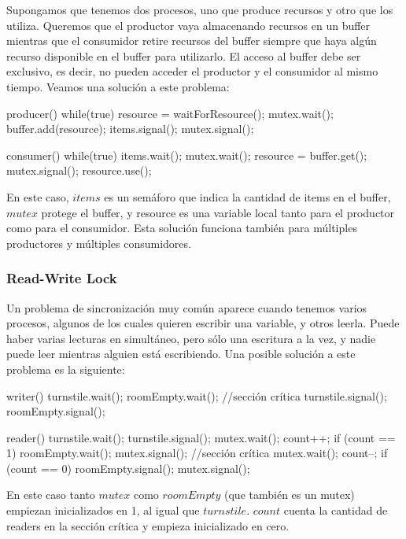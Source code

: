 \documentclass{article}
\begin{document}
Supongamos que tenemos dos procesos, uno que produce recursos y otro que los utiliza. Queremos que el productor vaya almacenando recursos en un buffer mientras que el consumidor retire recursos del buffer siempre que haya alg\'un recurso disponible en el buffer para utilizarlo. El acceso al buffer debe ser exclusivo, es decir, no pueden acceder el productor y el consumidor al mismo tiempo. Veamos una soluci\'on a este problema:

\begin{code}
producer()
{
    while(true)
		{
        resource = waitForResource();
    		mutex.wait();
		        buffer.add(resource);
				    items.signal();
	      mutex.signal();
		}
}

consumer()
{
    while(true)
		{
		    items.wait();
				mutex.wait();
				    resource = buffer.get();
			  mutex.signal();
				resource.use();
		}
}
\end{code}

En este caso, $items$ es un sem\'aforo que indica la cantidad de items en el buffer, $mutex$ protege el buffer, y resource es una variable local tanto para el productor como para el consumidor. Esta soluci\'on funciona tambi\'en para m\'ultiples productores y m\'ultiples consumidores.

\subsubsection{Read-Write Lock}

Un problema de sincronizaci\'on muy com\'un aparece cuando tenemos varios procesos, algunos de los cuales quieren escribir una variable, y otros leerla. Puede haber varias lecturas en simult\'aneo, pero s\'olo una escritura a la vez, y nadie puede leer mientras alguien est\'a escribiendo. Una posible soluci\'on a este problema es la siguiente:

\begin{code}
writer()
{
    turnstile.wait();
		    roomEmpty.wait();
				//sección crítica
		turnstile.signal();
		roomEmpty.signal();
}

reader()
{
    turnstile.wait();
		turnstile.signal();
		mutex.wait();
		    count++;
				if (count == 1)
				    roomEmpty.wait();
		mutex.signal();
		//sección crítica
		mutex.wait();
		    count--;
				if (count == 0)
				    roomEmpty.signal();
	  mutex.signal();
}
\end{code}

En este caso tanto $mutex$ como $roomEmpty$ (que tambi\'en es un mutex) empiezan inicializados en 1, al igual que $turnstile$. $count$ cuenta la cantidad de readers en la secci\'on cr\'itica y empieza inicializado en cero.
\end{document}
